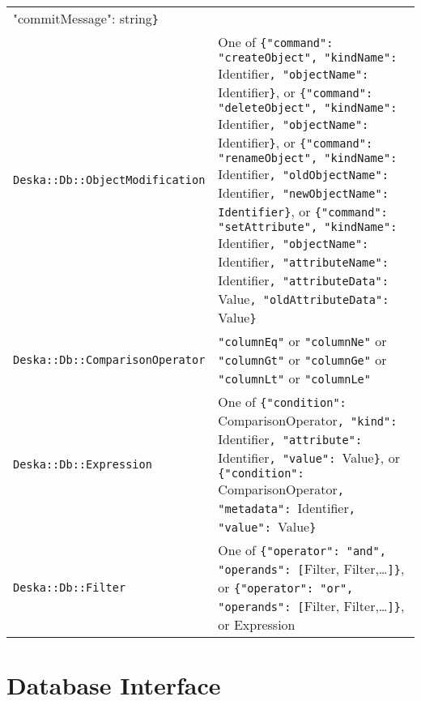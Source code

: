 \documentclass{article}
\begin{document}
\begin{longtable}{ p{60mm} p{90mm} }
{        "commitMessage": }string{\tt\}}
        \\
    {\tt Deska::Db::ObjectModification} &
        One of \newline
        {\tt \{"command": "createObject", "kindName": }Identifier{\tt, "objectName": }Identifier{\tt \}}, \newline
        or \newline
        {\tt \{"command": "deleteObject", "kindName": }Identifier{\tt, "objectName": }Identifier{\tt \}}, \newline
        or \newline
        {\tt \{"command": "renameObject", "kindName": }Identifier{\tt, "oldObjectName": }Identifier{\tt,
        "newObjectName": }{\tt Identifier\}}, \newline
        or \newline
        {\tt \{"command": "setAttribute", "kindName": }Identifier{\tt, "objectName": }Identifier{\tt, "attributeName":
        }Identifier{\tt, "attributeData": }Value{\tt, "oldAttributeData": }Value{\tt \}} \\
    {\tt Deska::Db::ComparisonOperator} &
        {\tt "columnEq"} or {\tt "columnNe"} or {\tt "columnGt"} or {\tt "columnGe"} or {\tt "columnLt"} or
        {\tt "columnLe"}
        \\
    {\tt Deska::Db::Expression} &
        One of \newline
        {\tt \{"condition": }ComparisonOperator{\tt, "kind": }Identifier{\tt, "attribute": }Identifier{\tt, "value":
        }Value{\tt \}}, \newline
        or \newline
        {\tt \{"condition": }ComparisonOperator{\tt, "metadata": }Identifier{\tt, "value": }Value{\tt \}}
        \\
    {\tt Deska::Db::Filter} &
        One of \newline
        {\tt \{"operator": "and", "operands": [}Filter, Filter,\ldots{\tt]\}}, \newline
        or \newline
        {\tt \{"operator": "or", "operands": [}Filter, Filter,\ldots{\tt]\}}, \newline
        or \newline
        Expression

\end{longtable}

\section{Database Interface}
\end{document}
